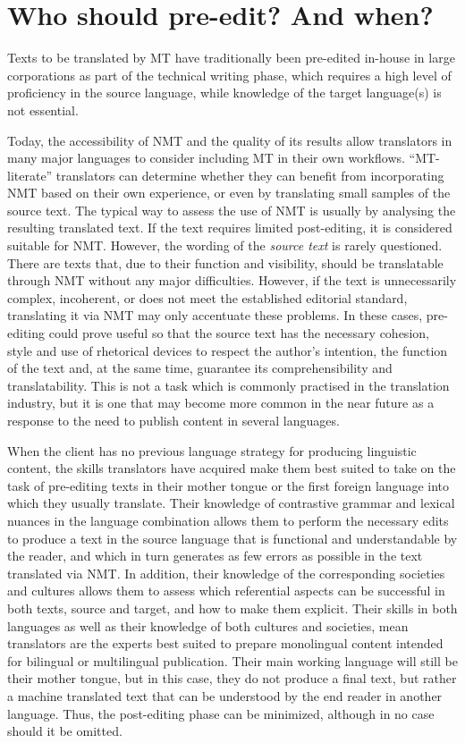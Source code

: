 \documentclass[output=paper,colorlinks,citecolor=brown,
]{langscibook}
\begin{document}
\section{Who should pre-edit? And when?} 

Texts to be translated by MT have traditionally been pre-edited in-house in large corporations as part of the technical writing phase, which requires a high level of proficiency in the source language, while knowledge of the target language(s) is not essential.

Today, the accessibility of NMT and the quality of its results allow translators in many major languages to consider including MT in their own workflows. “MT-literate” translators \citep{BowkerCiro2019} can determine whether they can benefit from incorporating NMT based on their own experience, or even by translating small samples of the source text. The typical way to assess the use of NMT is usually by analysing the resulting translated text. If the text requires limited post-editing, it is considered suitable for NMT. However, the wording of the \textit{source text} is rarely questioned. There are texts that, due to their function and visibility, should be translatable through NMT without any major difficulties. However, if the text is unnecessarily complex, incoherent, or does not meet the established editorial standard, translating it via NMT may only accentuate these problems. In these cases, pre-editing could prove useful so that the source text has the necessary cohesion, style and use of rhetorical devices to respect the author’s intention, the function of the text and, at the same time, guarantee its comprehensibility and translatability. This is not a task which is commonly practised in the translation industry, but it is one that may become more common in the near future as a response to the need to publish content in several languages.

When the client has no previous language strategy for producing linguistic content, the skills translators have acquired make them best suited to take on the task of pre-editing texts in their mother tongue or the first foreign language into which they usually translate. Their knowledge of contrastive grammar and lexical nuances in the language combination allows them to perform the necessary edits to produce a text in the source language that is functional and understandable by the reader, and which in turn generates as few errors as possible in the text translated via NMT. In addition, their knowledge of the corresponding societies and cultures allows them to assess which referential aspects can be successful in both texts, source and target, and how to make them explicit. Their skills in both languages as well as their knowledge of both cultures and societies, mean translators are the experts best suited to prepare monolingual content intended for bilingual or multilingual publication. Their main working language will still be their mother tongue, but in this case, they do not produce a final text, but rather a machine translated text that can be understood by the end reader in another language. Thus, the post-editing phase can be minimized, although in no case should it be omitted.
\end{document}
